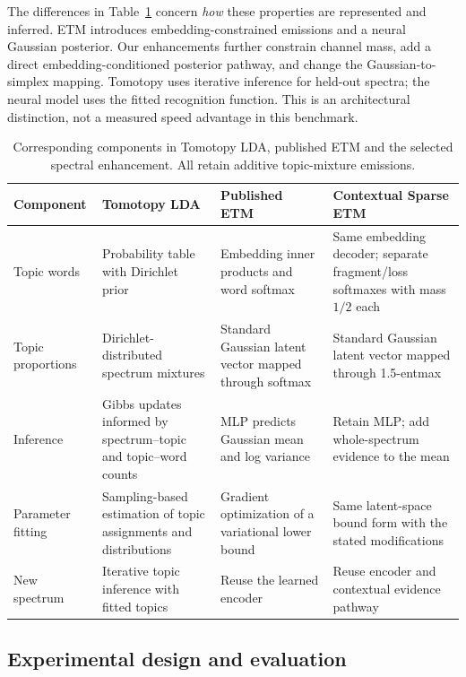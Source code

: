 \documentclass[10pt,a4paper]{article}
\begin{document}
The differences in Table~\ref{tab:lineage} concern \emph{how} these properties
are represented and inferred. ETM introduces embedding-constrained emissions
and a neural Gaussian posterior. Our enhancements further constrain channel
mass, add a direct embedding-conditioned posterior pathway, and change the
Gaussian-to-simplex mapping. Tomotopy uses iterative inference for held-out
spectra; the neural model uses the fitted recognition function. This is an
architectural distinction, not a measured speed advantage in this benchmark.

\begin{table}[H]
\centering\small
\caption{Corresponding components in Tomotopy LDA, published ETM and the
selected spectral enhancement. All retain additive topic-mixture emissions.}
\label{tab:lineage}
\renewcommand{\arraystretch}{1.18}
\begin{tabularx}{\textwidth}{@{}>{\raggedright\arraybackslash}p{2.2cm}*{3}{>{\raggedright\arraybackslash}X}@{}}
\toprule
Component & Tomotopy LDA & Published ETM & Contextual Sparse ETM \\
\midrule
Topic words & Probability table with Dirichlet prior
& Embedding inner products and word softmax
& Same embedding decoder; separate fragment/loss softmaxes with mass $1/2$ each \\
Topic proportions & Dirichlet-distributed spectrum mixtures
& Standard Gaussian latent vector mapped through softmax
& Standard Gaussian latent vector mapped through 1.5-entmax \\
Inference & Gibbs updates informed by spectrum--topic and topic--word counts
& MLP predicts Gaussian mean and log variance
& Retain MLP; add whole-spectrum evidence to the mean \\
Parameter fitting & Sampling-based estimation of topic assignments and distributions
& Gradient optimization of a variational lower bound
& Same latent-space bound form with the stated modifications \\
New spectrum & Iterative topic inference with fitted topics
& Reuse the learned encoder
& Reuse encoder and contextual evidence pathway \\
\bottomrule
\end{tabularx}
\end{table}

\subsection{Experimental design and evaluation}
\end{document}
